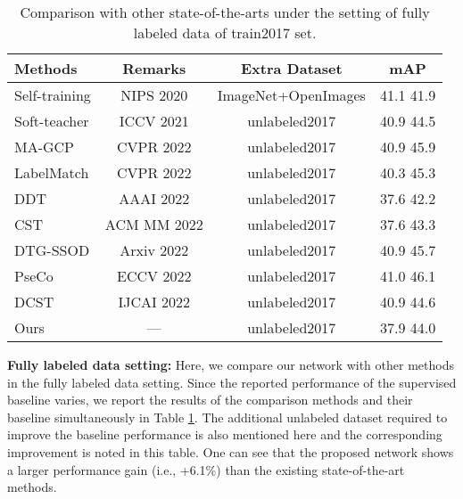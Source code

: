 \documentclass[10pt,twocolumn,letterpaper]{article}
\begin{document}
\begin{table}[t!]
\centering
\caption{Comparison with other state-of-the-arts under the setting of fully labeled data of train2017 set. }
\label{tab:supervisedF}
\begin{adjustbox}{width=.475\textwidth,center}
\begin{tabular}{l|c|cc}
\hline
\textbf{Methods}    &   Remarks          & \quad \textbf{Extra Dataset} \quad      & \quad \textbf{mAP} \quad      \\ \hline
Self-training \cite{zoph2020rethinking}   &  NIPS 2020     & ImageNet+OpenImages & 41.1  41.9 \\
Soft-teacher \cite{xu2021end}   & ICCV 2021         & unlabeled2017       & 40.9  44.5 \\
MA-GCP \cite{MAGCP}    & CVPR 2022        & unlabeled2017       & 40.9  45.9 \\
LabelMatch \cite{LabelMatch}  & CVPR 2022          & unlabeled2017       & 40.3  45.3 \\
DDT \cite{DDT}    & AAAI 2022        & unlabeled2017       & 37.6  42.2 \\
CST \cite{CST}    & ACM MM 2022        & unlabeled2017       & 37.6  43.3 \\
DTG-SSOD \cite{DTG-SSOD}  & Arxiv 2022          & unlabeled2017       & 40.9  45.7 \\
PseCo \cite{PseCo}    & ECCV 2022        & unlabeled2017       & 41.0  46.1 \\
DCST \cite{DCST}     & IJCAI 2022       & unlabeled2017       & 40.9  44.6 \\
Ours  & ---   & unlabeled2017       & 37.9  44.0 \\ \hline
\end{tabular}
\end{adjustbox}
\end{table}\noindent\textbf{Fully labeled data setting:}
Here, we compare our network with other methods in the fully labeled data setting. Since the reported performance of the supervised baseline varies, we report the results of the comparison methods and their baseline simultaneously in Table \ref{tab:supervisedF}. The additional unlabeled dataset required to improve the baseline performance is also mentioned here and the corresponding improvement is noted in this table. One can see that the proposed network shows a larger performance gain (i.e., +6.1\%) than the existing state-of-the-art methods.
\end{document}
